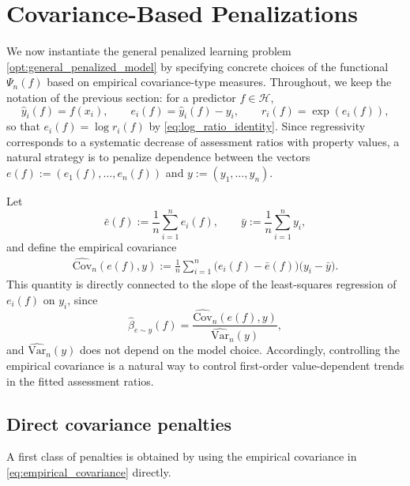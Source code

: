\documentclass[12pt, draft]{article}
\theoremstyle{plain}
\theoremstyle{definition}
\newcommand{\1}{\mathbf{1}}
\newcommand{\Cov}{\text{Cov}}
\newcommand{\Var}{\text{Var}}
\renewcommand{\H}{\mathcal{H}}
\begin{document}


\section{Covariance-Based Penalizations}

We now instantiate the general penalized learning problem \eqref{opt:general_penalized_model} by specifying concrete choices of the functional $\Psi_n(f)$ based on empirical covariance-type measures. Throughout, we keep the notation of the previous section: for a predictor $f \in \H$,
\[
\hat y_i(f) = f(x_i),
\qquad
e_i(f) = \hat y_i(f) - y_i,
\qquad
r_i(f) = \exp(e_i(f)),
\]
so that $e_i(f)=\log r_i(f)$ by \eqref{eq:log_ratio_identity}. Since regressivity corresponds to a systematic decrease of assessment ratios with property values, a natural strategy is to penalize dependence between the vectors $e(f):=(e_1(f),\dots,e_n(f))$ and $y:=(y_1,\dots,y_n)$.

Let
\[
\bar e(f) := \frac{1}{n}\sum_{i=1}^n e_i(f),
\qquad
\bar y := \frac{1}{n}\sum_{i=1}^n y_i,
\]
and define the empirical covariance
\begin{align}
    \label{eq:empirical_covariance}
    \widehat{\Cov}_n(e(f),y)
    :=
    \frac{1}{n}\sum_{i=1}^n
    \bigl(e_i(f)-\bar e(f)\bigr)\bigl(y_i-\bar y\bigr).
\end{align}
This quantity is directly connected to the slope of the least-squares regression of $e_i(f)$ on $y_i$, since
\[
\widehat{\beta}_{e\sim y}(f)
=
\frac{\widehat{\Cov}_n(e(f),y)}{\widehat{\Var}_n(y)},
\]
and $\widehat{\Var}_n(y)$ does not depend on the model choice. Accordingly, controlling the empirical covariance is a natural way to control first-order value-dependent trends in the fitted assessment ratios.

\subsection{Direct covariance penalties}

A first class of penalties is obtained by using the empirical covariance in \eqref{eq:empirical_covariance} directly.
\end{document}
